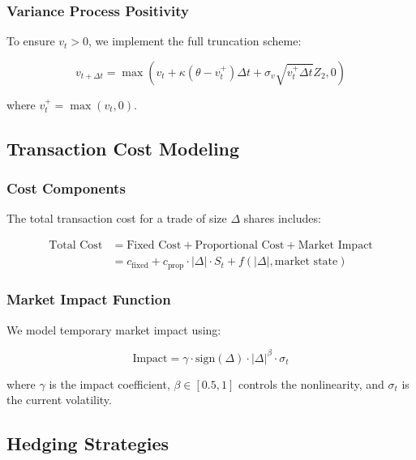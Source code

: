 \documentclass[12pt,a4paper]{article}
\begin{document}
\subsubsection{Variance Process Positivity}

To ensure $v_t > 0$, we implement the full truncation scheme:

\begin{equation}
v_{t+\Delta t} = \max(v_t + \kappa(\theta - v_t^+)\Delta t + \sigma_v\sqrt{v_t^+ \Delta t} Z_2, 0)
\end{equation}

where $v_t^+ = \max(v_t, 0)$.

\subsection{Transaction Cost Modeling}

\subsubsection{Cost Components}

The total transaction cost for a trade of size $\Delta$ shares includes:

\begin{align}
\text{Total Cost} &= \text{Fixed Cost} + \text{Proportional Cost} + \text{Market Impact} \\
&= c_{\text{fixed}} + c_{\text{prop}} \cdot |\Delta| \cdot S_t + f(|\Delta|, \text{market state})
\end{align}

\subsubsection{Market Impact Function}

We model temporary market impact using:

\begin{equation}
\text{Impact} = \gamma \cdot \text{sign}(\Delta) \cdot |\Delta|^{\beta} \cdot \sigma_t
\end{equation}

where $\gamma$ is the impact coefficient, $\beta \in [0.5, 1]$ controls the nonlinearity, and $\sigma_t$ is the current volatility.

\subsection{Hedging Strategies}
\end{document}
